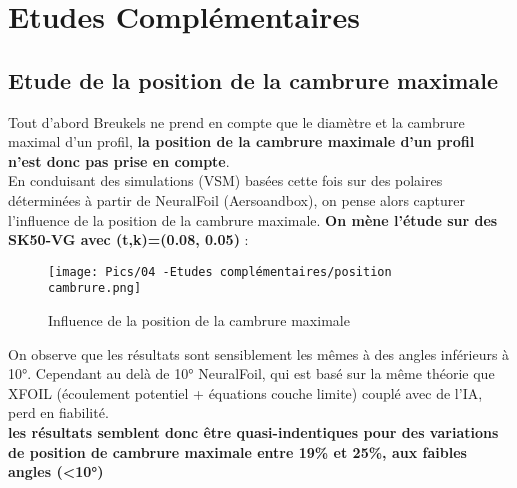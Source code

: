 
\chapter{Etudes Complémentaires} 	
\label{Chapter4} 		



\section{Etude de la position de la cambrure maximale}
\label{sec:Ch4.1}

Tout d'abord Breukels ne prend en compte que le diamètre et la cambrure maximal d'un profil, \textbf{la position de la cambrure maximale d'un profil n'est donc pas prise en compte}. \\
En conduisant des simulations (VSM) basées cette fois sur des polaires déterminées à partir de NeuralFoil (Aersoandbox), on pense alors capturer l'influence de la position de la cambrure maximale. \textbf{On mène l'étude  sur des SK50-VG avec (t,k)=(0.08, 0.05)} :

\begin{figure}[H]
    \centering
    \texttt{[image: Pics/04 -Etudes complémentaires/position cambrure.png]}  
    \caption{Influence de la position de la cambrure maximale}
    \label{fig:influence cambrure position}
\end{figure}

On observe que les résultats sont sensiblement les mêmes à des angles inférieurs à 10°. Cependant au delà de 10° NeuralFoil, qui est basé sur la même théorie que XFOIL (écoulement potentiel + équations couche limite) couplé avec de l'IA, perd en fiabilité. \\
\textbf{les résultats semblent donc être quasi-indentiques pour des variations de position de cambrure maximale entre 19\% et 25\%, aux faibles angles (<10°)}


